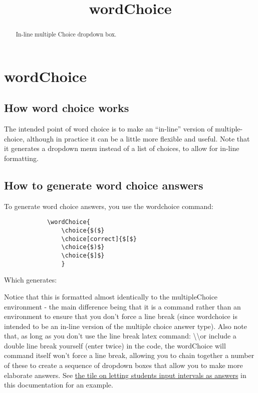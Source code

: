 \documentclass{ximera}
\title{wordChoice}
\begin{document}
\begin{abstract}
    In-line multiple Choice dropdown box.
\end{abstract}
\maketitle
\section*{wordChoice}
    \subsection*{How word choice works}
    
    The intended point of word choice is to make an ``in-line'' version of multiple-choice, although in practice it can be a little more flexible and useful. Note that it generates a dropdown menu instead of a list of choices, to allow for in-line formatting.

    \subsection*{How to generate word choice answers}
        To generate word choice answers, you use the wordchoice command:
        \begin{verbatim} 
            \wordChoice{
                \choice{$($}
                \choice[correct]{$[$}
                \choice{$)$}
                \choice{$]$}
                }
        \end{verbatim}
        
        Which generates: 
        \wordChoice{
            \choice{$($}
            \choice[correct]{$[$}
            \choice{$)$}
            \choice{$]$}
            }
        
        Notice that this is formatted almost identically to the multipleChoice environment - the main difference being that it is a command rather than an environment to ensure that you don't force a line break (since wordchoice is intended to be an in-line version of the multiple choice answer type). Also note that, as long as you don't use the line break latex command: \textbackslash\textbackslash or include a double line break yourself (enter twice) in the code, the wordChoice will command itself won't force a line break, allowing you to chain together a number of these to create a sequence of dropdown boxes that allow you to make more elaborate answers. See \href{https://xronos.clas.ufl.edu/examples/exampleCore/problemDesign/intervals}{the tile on letting students input intervals as answers} in this documentation for an example.
        
\end{document}
